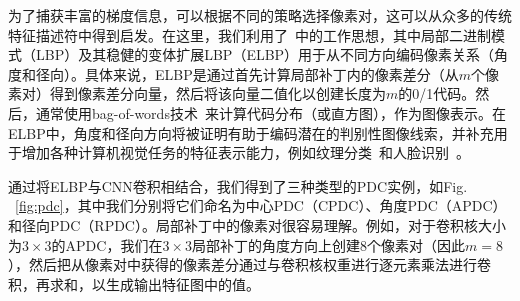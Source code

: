 \documentclass[10pt,twocolumn,letterpaper]{article}
\begin{document}
为了捕获丰富的梯度信息，可以根据不同的策略选择像素对，这可以从众多的传统特征描述符中得到启发。在这里，我们利用了~\cite{ojala2002lbp, liu2012extended, su2019bird}中的工作思想，其中局部二进制模式（LBP）及其稳健的变体扩展LBP（ELBP）用于从不同方向编码像素关系（角度和径向）。具体来说，ELBP是通过首先计算局部补丁内的像素差分（从$ m $个像素对）得到像素差分向量，然后将该向量二值化以创建长度为$ m $的0/1代码。然后，通常使用bag-of-words技术~\cite{liu2019bow}来计算代码分布（或直方图），作为图像表示。在ELBP中，角度和径向方向将被证明有助于编码潜在的判别性图像线索，并补充用于增加各种计算机视觉任务的特征表示能力，例如纹理分类~\cite{liu2012extended, liu2011sorted}和人脸识别~\cite{su2019bird}。

通过将ELBP与CNN卷积相结合，我们得到了三种类型的PDC实例，如Fig. ~\ref{fig:pdc}，其中我们分别将它们命名为中心PDC（CPDC）、角度PDC（APDC）和径向PDC（RPDC）。局部补丁中的像素对很容易理解。例如，对于卷积核大小为$ 3 \times 3 $的APDC，我们在$ 3\times 3 $局部补丁的角度方向上创建8个像素对（因此$ m = 8 $），然后把从像素对中获得的像素差分通过与卷积核权重进行逐元素乘法进行卷积，再求和，以生成输出特征图中的值。
\end{document}
